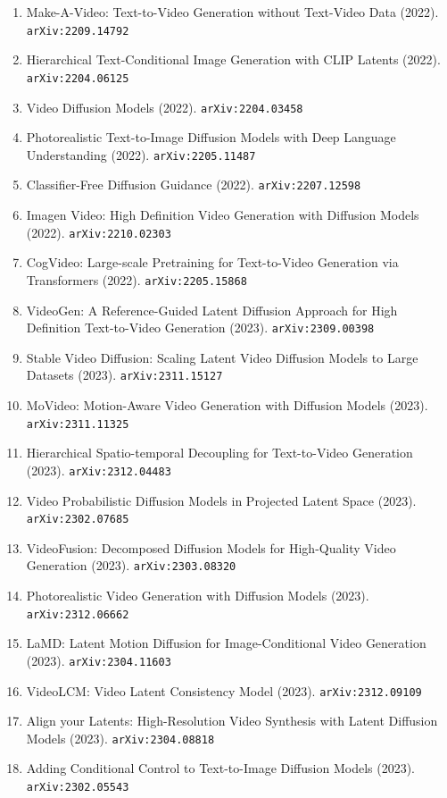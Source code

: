 \documentclass[11pt]{article}
\begin{document}
\begin{enumerate}
  \item Make-A-Video: Text-to-Video Generation without Text-Video Data (2022). \texttt{arXiv:2209.14792}
  \item Hierarchical Text-Conditional Image Generation with CLIP Latents (2022). \texttt{arXiv:2204.06125}
  \item Video Diffusion Models (2022). \texttt{arXiv:2204.03458}
  \item Photorealistic Text-to-Image Diffusion Models with Deep Language
  Understanding (2022). \texttt{arXiv:2205.11487}
  \item Classifier-Free Diffusion Guidance (2022). \texttt{arXiv:2207.12598}
  \item Imagen Video: High Definition Video Generation with Diffusion Models (2022). \texttt{arXiv:2210.02303}
  \item CogVideo: Large-scale Pretraining for Text-to-Video Generation via
  Transformers (2022). \texttt{arXiv:2205.15868}
  \item VideoGen: A Reference-Guided Latent Diffusion Approach for High
  Definition Text-to-Video Generation (2023). \texttt{arXiv:2309.00398}
  \item Stable Video Diffusion: Scaling Latent Video Diffusion Models to Large
  Datasets (2023). \texttt{arXiv:2311.15127}
  \item MoVideo: Motion-Aware Video Generation with Diffusion Models (2023). \texttt{arXiv:2311.11325}
  \item Hierarchical Spatio-temporal Decoupling for Text-to-Video Generation (2023). \texttt{arXiv:2312.04483}
  \item Video Probabilistic Diffusion Models in Projected Latent Space (2023). \texttt{arXiv:2302.07685}
  \item VideoFusion: Decomposed Diffusion Models for High-Quality Video
  Generation (2023). \texttt{arXiv:2303.08320}
  \item Photorealistic Video Generation with Diffusion Models (2023). \texttt{arXiv:2312.06662}
  \item LaMD: Latent Motion Diffusion for Image-Conditional Video Generation (2023). \texttt{arXiv:2304.11603}
  \item VideoLCM: Video Latent Consistency Model (2023). \texttt{arXiv:2312.09109}
  \item Align your Latents: High-Resolution Video Synthesis with Latent
  Diffusion Models (2023). \texttt{arXiv:2304.08818}
  \item Adding Conditional Control to Text-to-Image Diffusion Models (2023). \texttt{arXiv:2302.05543}

\end{enumerate}
\end{document}
